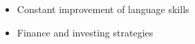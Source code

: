 
\begin{itemize}
    \item {Constant improvement of language skills}
    \item {Finance and investing strategies}
\end{itemize}


 